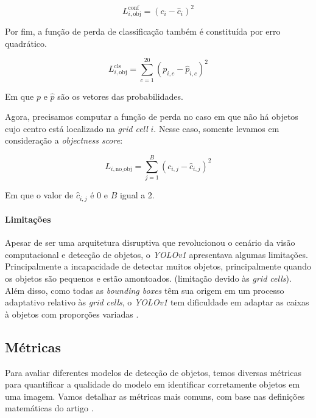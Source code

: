 \begin{center}
\[
L_{i, \text{obj}}^{\text{conf}} =  (c_i - \hat{c}_i)^2
\]
\end{center}

Por fim, a função de perda de classificação também é constituída por erro quadrático.

\begin{center}
\[
L_{i, \text{obj}}^{\text{cls}} = \sum_{c=1}^{20} (p_{i,c} - \hat{p}_{i,c})^2
\]
\end{center}

Em que $p$ e $\hat{p}$ são os vetores das probabilidades.

Agora, precisamos computar a função de perda no caso em que não há objetos cujo centro está localizado na \emph{grid cell} $i$. Nesse caso, somente levamos em consideração a \emph{objectness score}:

\begin{center}
\[
L_{i, \text{no\_obj}} = \sum_{j=1}^{B} (c_{i,j} - \hat{c}_{i,j})^2
\]
\end{center}

Em que o valor de $\hat{c}_{i,j}$ é 0 e $B$ igual a 2.

\paragraph{Limitações}
Apesar de ser uma arquitetura disruptiva que revolucionou o cenário da visão computacional e detecção de objetos, o \emph{YOLOv1} apresentava algumas limitações. Principalmente a incapacidade de detectar muitos objetos, principalmente quando os objetos são pequenos e estão amontoados. (limitação devido às \emph{grid cells}). Além disso, como todas as \emph{bounding boxes} têm sua origem em um processo adaptativo relativo às \emph{grid cells}, o \emph{YOLOv1} tem dificuldade em adaptar as caixas à objetos com proporções variadas \citep{yolo_review}.

\subsection{Métricas}
Para avaliar diferentes modelos de detecção de objetos, temos diversas métricas para quantificar a qualidade do modelo em identificar corretamente objetos em uma imagem. Vamos detalhar as métricas mais comuns, com base nas definições matemáticas do artigo \citep{Padilla2020A}.

